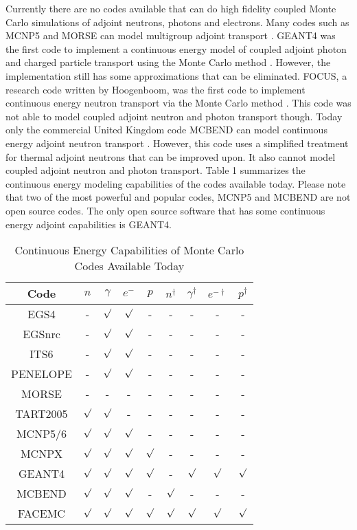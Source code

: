 \documentclass[letterpaper,12pt]{article}
\begin{document}
Currently there are no codes available that can do high fidelity coupled Monte Carlo simulations of adjoint neutrons, photons and electrons. Many codes such as MCNP5 and MORSE can model multigroup adjoint transport \cite{wagner_mcnp:_1994, taylor_morse-h:_1982}. GEANT4 was the first code to implement a continuous energy model of coupled adjoint photon and charged particle transport using the Monte Carlo method \cite{desorgher_implementation_2010}. However, the implementation still has some approximations that can be eliminated. FOCUS, a research code written by Hoogenboom, was the first code to implement continuous energy neutron transport via the Monte Carlo method \cite{hoogenboom_adjoint_1977}. This code was not able to model coupled adjoint neutron and photon transport though. Today only the commercial United Kingdom code MCBEND can model continuous energy adjoint neutron transport \cite{grimstone_extension_1998}. However, this code uses a simplified treatment for thermal adjoint neutrons that can be improved upon. It also cannot model coupled adjoint neutron and photon transport. Table 1 summarizes the continuous energy modeling capabilities of the codes available today. Please note that two of the most powerful and popular codes, MCNP5 and MCBEND are not open source codes. The only open source software that has some continuous energy adjoint capabilities is GEANT4.

\begin{table}[ht]
  \caption{Continuous Energy Capabilities of Monte Carlo Codes Available Today}
  \centering
  \begin{tabular}{c c c c c c c c c}
    \hline\hline
    Code & $n$ & $\gamma$ & $e^-$ & $p$ & $n^{\dagger}$ & $\gamma^{\dagger}$ & $e^{-\dagger}$ & $p^{\dagger}$ \\ [0.5ex]
    \hline
    EGS4 & - & $\surd$ & $\surd$ & - & - & - & - & - \\
    EGSnrc & - & $\surd$ & $\surd$ & - & - & - & - & - \\
    ITS6 & - & $\surd$ & $\surd$ & - & - & - & - & - \\
    PENELOPE & - & $\surd$ & $\surd$ & - & - & - & - & - \\
    MORSE & - & - & - & - & - & - & - & - \\
    TART2005 & $\surd$ & $\surd$ & - & - & - & - & - & - \\
    MCNP5/6 & $\surd$ & $\surd$ & $\surd$ & - & - & - & - & - \\
    MCNPX & $\surd$ & $\surd$ & $\surd$ & $\surd$ & - & - & - & - \\
    GEANT4 & $\surd$ & $\surd$ & $\surd$ & $\surd$ & - & $\surd$ & $\surd$ & $\surd$ \\
    MCBEND & $\surd$ & $\surd$ & $\surd$ & - & $\surd$ & - & - & - \\ [1ex]
    \hline
    FACEMC & $\surd$ & $\surd$ & $\surd$ & $\surd$ & $\surd$ & $\surd$ & $\surd$ & $\surd$ \\ [1ex]
    \hline
  \end{tabular}
  \label{table:mccodes}
\end{table}
\end{document}
